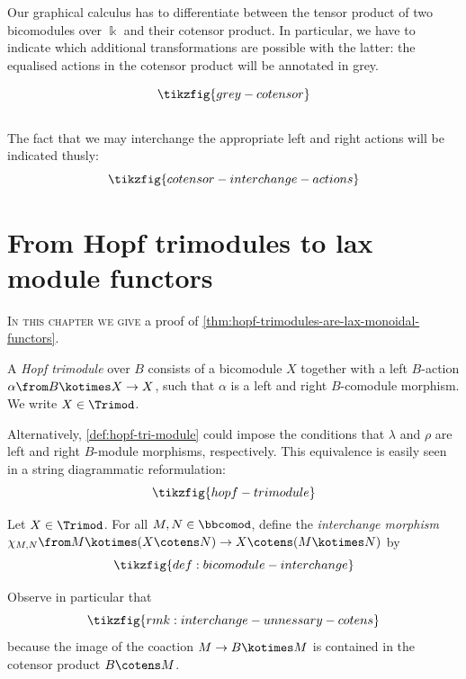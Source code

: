 Our graphical calculus has to differentiate between
the tensor product of two bicomodules over \(\Bbbk\)
and their cotensor product.
In particular, we have to indicate which additional transformations are possible with the latter:
the equalised actions in the cotensor product will be annotated in grey.

\[
  \tikzfig{grey-cotensor}
\]\\
The fact that we may interchange the appropriate left and right actions will be indicated thusly:
\[
  \tikzfig{cotensor-interchange-actions}
\]

\section{From Hopf trimodules to lax module functors}\label{sec:hopf-trimodules-lax-mod-funs}

\textsc{In this chapter we give}
a proof of \cref{thm:hopf-trimodules-are-lax-monoidal-functors}.

\begin{definition}\label{def:hopf-tri-module}
  A \emph{Hopf trimodule} over \(B\) consists of a bicomodule \(X\)
  together with a left \(B\)-action \(\alpha\from B \kotimes X \to X\),
  such that \(\alpha\) is a left and right \(B\)\hyp{}comodule morphism.
  We write \(X \in \Trimod\).
\end{definition}

Alternatively, \cref{def:hopf-tri-module} could impose the conditions
that \(\lambda\) and \(\rho\) are left and right \(B\)\hyp{}module morphisms, respectively.
This equivalence is easily seen in a string diagrammatic reformulation:
\begin{equation}\label{eq:hopf-trimodule}
  \tikzfig{hopf-trimodule}
\end{equation}

\begin{definition}\label{def:bicomodule-interchange}
  Let \(X \in \Trimod\).
  For all \(M, N \in \bbcomod\), define the \emph{interchange morphism}
  \(\chi_{M, N} \from M \kotimes (X \cotens N) \to X \cotens (M \kotimes N)\)
  by\\
  \[
    \tikzfig{def:bicomodule-interchange}
  \]
\end{definition}

Observe in particular that
\[
  \tikzfig{rmk:interchange-unnessary-cotens}
\]
because the image of the coaction \(M \to B \kotimes M\) is contained in the cotensor product \(B \cotens M\).


